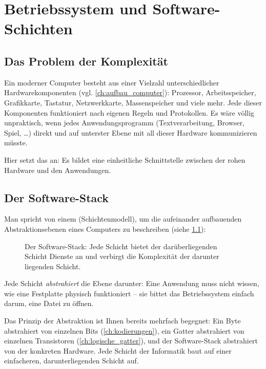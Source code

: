 \chapter{Betriebssystem und Software-Schichten}\label{ch:betriebssystem}

\section{Das Problem der Komplexität}

Ein moderner Computer besteht aus einer Vielzahl unterschiedlicher Hardwarekomponenten (vgl. \cref{ch:aufbau_computer}): Prozessor, Arbeitsspeicher, Grafikkarte, Tastatur, Netzwerkkarte, Massenspeicher und viele mehr. Jede dieser Komponenten funktioniert nach eigenen Regeln und Protokollen. Es wäre völlig unpraktisch, wenn jedes Anwendungsprogramm (Textverarbeitung, Browser, Spiel, \ldots) direkt und auf unterster Ebene mit all dieser Hardware kommunizieren müsste.

Hier setzt das  an: Es bildet eine einheitliche Schnittstelle zwischen der rohen Hardware und den Anwendungen.

\section{Der Software-Stack}

Man spricht von einem  (Schichtenmodell), um die aufeinander aufbauenden Abstraktionsebenen eines Computers zu beschreiben (siehe \cref{fig:software_stack}):

\begin{figure}[H]
    \centering
    
    \caption{Der Software-Stack: Jede Schicht bietet der darüberliegenden Schicht Dienste an und verbirgt die Komplexität der darunter liegenden Schicht.}
    \label{fig:software_stack}
\end{figure}

Jede Schicht \emph{abstrahiert} die Ebene darunter: Eine Anwendung muss nicht wissen, wie eine Festplatte physisch funktioniert -- sie bittet das Betriebssystem einfach darum, eine Datei zu öffnen.

\begin{myremark}
    Das Prinzip der Abstraktion ist Ihnen bereits mehrfach begegnet: Ein Byte abstrahiert von einzelnen Bits (\cref{ch:kodierungen}), ein Gatter abstrahiert von einzelnen Transistoren (\cref{ch:logische_gatter}), und der Software-Stack abstrahiert von der konkreten Hardware. Jede Schicht der Informatik baut auf einer einfacheren, darunterliegenden Schicht auf.
\end{myremark}

